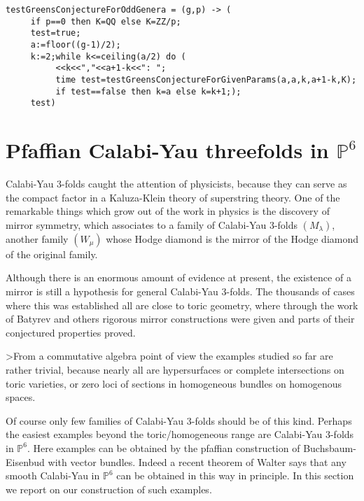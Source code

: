 \documentclass[12pt,leqno]{amsart}
\newcommand{\PP}{{\mathbb P}}
\newlength{\br}
\newlength{\ho}
\begin{document}
{\scriptsize
\begin{verbatim} 
testGreensConjectureForOddGenera = (g,p) -> (
     if p==0 then K=QQ else K=ZZ/p;
     test=true;
     a:=floor((g-1)/2);
     k:=2;while k<=ceiling(a/2) do (
          <<k<<","<<a+1-k<<": ";
          time test=testGreensConjectureForGivenParams(a,a,k,a+1-k,K); 
          if test==false then k=a else k=k+1;);
     test)
\end{verbatim}}









\section{Pfaffian Calabi-Yau threefolds in $\PP^6$}

Calabi-Yau 3-folds  caught the attention of physicists, 
because they can serve as the compact factor 
in a Kaluza-Klein theory of superstring theory. 
One of the remarkable things which grow out of the work in physics
is the discovery of mirror symmetry, which associates to a family of
Calabi-Yau 3-folds $(M_\lambda)$, another family $(W_\mu)$ whose Hodge
diamond is the mirror of the Hodge diamond of the original family.

Although there is an enormous amount of evidence at present, the existence 
of a mirror is still a hypothesis for general Calabi-Yau 3-folds. 
The thousands of cases where this was established all are close to toric
geometry, where through the work of Batyrev and others \cite{Ba,CK} 
rigorous mirror
constructions were given and parts of their conjectured properties proved.


\medskip
>From a commutative algebra point of view the examples studied so far are 
rather trivial, because nearly all are hypersurfaces or complete 
intersections on toric varieties, or zero loci of sections in 
homogeneous bundles on homogenous spaces.  

Of course only  few families of Calabi-Yau 3-folds should be of this kind.
Perhaps the easiest examples beyond the toric/homogeneous range are Calabi-Yau
3-folds in $\PP^6$. 
Here examples can be obtained by the pfaffian
construction of Buchsbaum-Eisenbud \cite{BE} with vector bundles. 
Indeed a recent theorem of Walter \cite{Wa} says 
that any smooth Calabi-Yau in $\PP^6$ can be obtained in this way in principle. 
In this section we report on our construction of such examples. 
\end{document}
